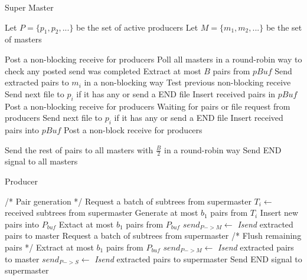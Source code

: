 \documentclass[conference]{IEEEtran}
\begin{document}
\begin{algorithm}
\caption{Super Master}
\label{sp}
\begin{algorithmic}
	\STATE Let $P=\{p_1, p_2, ...\}$ be the set of active producers
	\STATE Let $M=\{m_1, m_2, ...\}$ be the set of masters

	    \STATE Post a non-blocking receive for producers
		    \STATE Poll all masters in a round-robin way to check any posted send was completed
		        \STATE Extract at most $B$ pairs from $pBuf$
		        \STATE Send extracted pairs to $m_i$ in a non-blocking way
	 	    \ENDIF
		    \ENDIF
           	\STATE Test previous non-blocking receive
		            \STATE Send next file to $p_i$ if it has any or send a END file
		        \ELSE 
			        \STATE Insert received pairs in $pBuf$
		        \ENDIF
		        \STATE Post a non-blocking receive for producers
		    \ENDIF
	    \ELSE
		    \STATE Waiting for pairs or file request from producers
		        \STATE Send next file to $p_i$ if it has any or send a END file
		    \ELSE
		        \STATE Insert received pairs into $pBuf$
		    \ENDIF
		    \STATE Post a non-block receive for producers
	    \ENDIF
    \ENDWHILE

	\STATE Send the rest of pairs to all masters with $\frac{B}{2}$ in a round-robin way
	\STATE Send END signal to all masters
\end{algorithmic}
\end{algorithm}

\begin{algorithm}
\caption{Producer}
\label{pd}
\begin{algorithmic}
    \STATE /* Pair generation */
    \STATE Request a batch of subtrees from supermaster
    \WHILE{\TRUE}
        \STATE $T_i \leftarrow$ received subtrees from supermaster 
        \ENDIF
        \REPEAT
                \STATE Generate at most $b_1$ pairs from $T_i$
                \STATE Insert new pairs into $P_{buf}$
            \ENDIF
                \STATE Extact at most $b_1$ pairs from $P_{buf}$
                \STATE $send_{P->M}\leftarrow$ {\it Isend} extracted pairs to master
            \ENDIF
        \STATE Request a batch of subtrees from supermaster
    \ENDWHILE
    \STATE /* Flush remaining pairs */
        \STATE Extract at most $b_1$ pairs from $P_{buf}$
            \STATE $send_{P->M}\leftarrow$ {\it Isend} extracted pairs to master
        \ENDIF
            \STATE $send_{P->S}\leftarrow$ {\it Isend} extracted pairs to supermaster
        \ENDIF
    \ENDWHILE
    \STATE Send END signal to supermaster
\end{algorithmic}
\end{algorithm}
\end{document}
